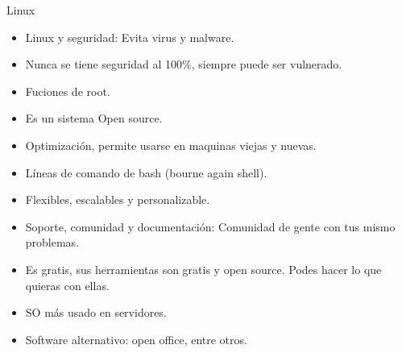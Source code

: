 \documentclass[10pt,xcolor={dvipsnames}]{beamer}
\begin{document}
\begin{frame}{Linux}
\begin{center}
\begin{itemize}
\item<3-|alert@3> Linux y seguridad: Evita virus y malware.
\item<4-|alert@4> Nunca se tiene seguridad al 100\%, siempre puede ser vulnerado.
\item<5-|alert@5> Fuciones de root.
\item<6-|alert@6> Es un sistema Open source.
\item<7-|alert@7> Optimización, permite usarse en maquinas viejas y nuevas. 
\item<8-|alert@8> Líneas de comando de bash (bourne again shell).
\item<9-|alert@9> Flexibles, escalables y personalizable.
\item<10-|alert@10> Soporte, comunidad y documentación: Comunidad de gente con tus mismo problemas.
\item<11-|alert@11> Es gratis, sus herramientas son gratis y open source. Podes hacer lo que quieras con ellas.
\item<12-|alert@12> SO más usado en servidores.
\item<13-|alert@13> Software alternativo: open office, entre otros.
\end{itemize}
\end{center}
\end{frame}
\end{document}
